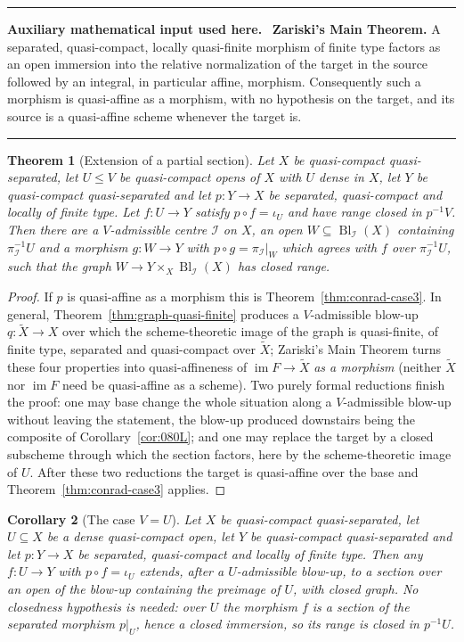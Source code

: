 \documentclass[11pt,a4paper]{article}
\theoremstyle{plain}
\newtheorem{theorem}{Theorem}[section]
\newtheorem{corollary}[theorem]{Corollary}
\theoremstyle{definition}
\theoremstyle{remark}
\newenvironment{auxinput}{%
  \par\medskip\begingroup\interlinepenalty=10000\relax
  \noindent\textcolor{orange!70!black}{\rule{\linewidth}{0.9pt}}%
  \par\nopagebreak\smallskip\noindent
  \textbf{Auxiliary mathematical input used here.}\ \ignorespaces}%
  {\par\nopagebreak\smallskip\nopagebreak\noindent
   \textcolor{orange!70!black}{\rule{\linewidth}{0.9pt}}\par\endgroup\medskip}
\newcommand{\Bl}{\operatorname{Bl}}
\newcommand{\sI}{\mathcal{I}}
\newcommand{\im}{\operatorname{im}}
\newcommand{\qcqs}{quasi-compact quasi-separated}
\begin{document}
\begin{auxinput}
\textbf{Zariski's Main Theorem.} A separated, quasi-compact, locally
quasi-finite morphism of finite type factors as an open immersion into the
relative normalization of the target in the source followed by an integral, in
particular affine, morphism. Consequently such a morphism is quasi-affine as a
morphism, with no hypothesis on the target, and its source is a quasi-affine
scheme whenever the target is.
\end{auxinput}

\begin{theorem}[Extension of a partial section]
\label{thm:conrad24}
Let $X$ be \qcqs{}, let $U\le V$ be quasi-compact opens of $X$ with $U$ dense
in $X$, let $Y$ be \qcqs{} and let $p\colon Y\to X$ be separated, quasi-compact
and locally of finite type. Let $f\colon U\to Y$ satisfy $p\circ f=\iota_U$ and
have range closed in $p^{-1}V$. Then there are a $V$-admissible centre $\sI$ on
$X$, an open $W\subseteq\Bl_\sI(X)$ containing $\pi_\sI^{-1}U$ and a morphism
$g\colon W\to Y$ with $p\circ g=\pi_\sI|_W$ which agrees with $f$ over
$\pi_\sI^{-1}U$, such that the graph $W\to Y\times_X\Bl_\sI(X)$ has closed
range.
\end{theorem}

\begin{proof}
If $p$ is quasi-affine as a morphism this is Theorem~\ref{thm:conrad-case3}. In
general, Theorem~\ref{thm:graph-quasi-finite} produces a $V$-admissible blow-up
$q\colon\widetilde X\to X$ over which the scheme-theoretic image of the graph
is quasi-finite, of finite type, separated and quasi-compact over
$\widetilde X$; Zariski's Main Theorem turns these four properties into
quasi-affineness of $\im F\to\widetilde X$ \emph{as a morphism} (neither
$\widetilde X$ nor $\im F$ need be quasi-affine as a scheme). Two purely formal
reductions finish the proof: one may base change the whole situation along a
$V$-admissible blow-up without leaving the statement, the blow-up produced
downstairs being the composite of Corollary~\ref{cor:080L}; and one may replace
the target by a closed subscheme through which the section factors, here by the
scheme-theoretic image of $U$. After these two reductions the target is
quasi-affine over the base and Theorem~\ref{thm:conrad-case3} applies.
\end{proof}

\begin{corollary}[The case $V=U$]
\label{cor:conrad25}
Let $X$ be \qcqs{}, let $U\subseteq X$ be a dense quasi-compact open, let $Y$
be \qcqs{} and let $p\colon Y\to X$ be separated, quasi-compact and locally of
finite type. Then any $f\colon U\to Y$ with $p\circ f=\iota_U$ extends, after a
$U$-admissible blow-up, to a section over an open of the blow-up containing the
preimage of $U$, with closed graph. No closedness hypothesis is needed: over
$U$ the morphism $f$ is a section of the separated morphism $p|_U$, hence a
closed immersion, so its range is closed in $p^{-1}U$.
\end{corollary}
\end{document}
